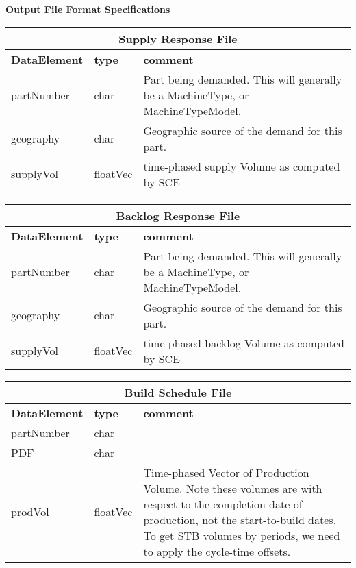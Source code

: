 \clearpage
\noindent
{\bf Output File Format Specifications}

\begin{tabular}{llp{4in}}
\multicolumn{3}{c}{{\bf Supply Response File}}\\ \hline\hline
{\bf DataElement} &  {\bf type}  &   {\bf comment} \\ \hline
partNumber  & char &     Part being demanded.  This will generally be a
                       MachineType, or MachineTypeModel. \\
geography   & char  &    Geographic source of the demand for this part. \\
supplyVol   & floatVec&  time-phased supply Volume as computed by SCE \\
\end{tabular}

\vspace{.5in}

\begin{tabular}{llp{4in}}
\multicolumn{3}{c}{{\bf Backlog Response File}}\\ \hline\hline
{\bf DataElement} &  {\bf type}  &   {\bf comment} \\ \hline
partNumber  & char &     Part being demanded.  This will generally be a
                       MachineType, or MachineTypeModel. \\
geography   & char  &    Geographic source of the demand for this part. \\
supplyVol   & floatVec&  time-phased backlog Volume as computed by SCE \\
\end{tabular}

\vspace{.5in}

\begin{tabular}{llp{4in}}
\multicolumn{3}{c}{{\bf Build Schedule File}}\\ \hline\hline
{\bf DataElement} &  {\bf type}  &   {\bf comment} \\ \hline
partNumber & char  \\
PDF        & char  \\
prodVol    & floatVec&  Time-phased Vector of Production Volume.  Note
                      these volumes are with respect to the completion
                      date of production, not the start-to-build dates.
                      To get STB volumes by periods, we need to apply
                      the cycle-time offsets. \\
\end{tabular}

